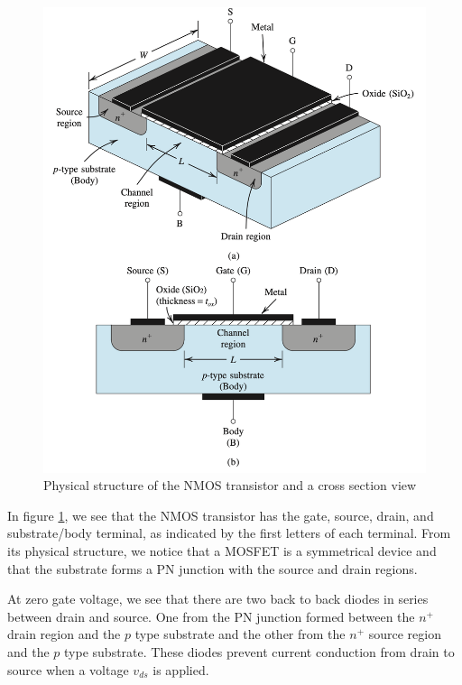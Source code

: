\begin{figure}[htb]
    \centering
    \includegraphics[scale=0.4]{figs/ch05/nmos_structure.png}
    \caption{Physical structure of the NMOS transistor and a cross section view}
    \label{fig:nmos_structure}
\end{figure}
In figure \ref{fig:nmos_structure}, we see that the NMOS transistor has the gate, source, drain, and substrate/body terminal, as indicated by the first letters of each terminal. From its physical structure, we notice that a MOSFET is a symmetrical device and that the substrate forms a PN junction with the source and drain regions.

At zero gate voltage, we see that there are two back to back diodes in series between drain and source. One from the PN junction formed between the $n^+$ drain region and the $p$ type substrate and the other from the $n^+$ source region and the $p$ type substrate. These diodes prevent current conduction from drain to source when a voltage $v_{ds}$ is applied.

